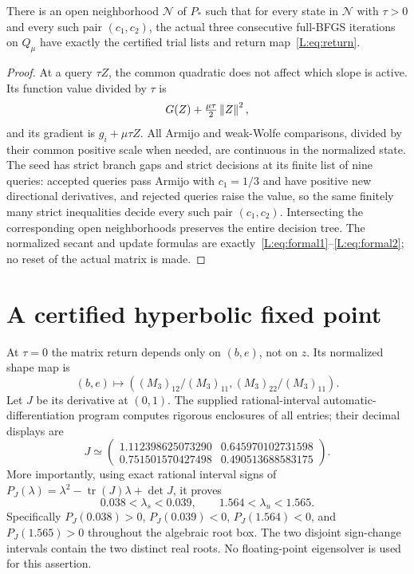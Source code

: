 \begin{lemma}\label{L:lem:agreement}
There is an open neighborhood $\mathcal N$ of $P_*$ such that for every state in $\mathcal N$ with $\tau>0$ and every such pair $(c_1,c_2)$, the actual three consecutive full-BFGS iterations on $Q_\mu$ have exactly the certified trial lists and return map~\eqref{L:eq:return}.
\end{lemma}
\begin{proof}
At a query $\tau Z$, the common quadratic does not affect which slope is active. Its function value divided by $\tau$ is
\[
 G(Z)+\tfrac{\mu\tau}{2}\left\lVert Z\right\rVert^2,
\]
and its gradient is $g_i+\mu\tau Z$. All Armijo and weak-Wolfe comparisons, divided by their common positive scale when needed, are continuous in the normalized state. The seed has strict branch gaps and strict decisions at its finite list of nine queries: accepted queries pass Armijo with $c_1=1/3$ and have positive new directional derivatives, and rejected queries raise the value, so the same finitely many strict inequalities decide every such pair $(c_1,c_2)$. Intersecting the corresponding open neighborhoods preserves the entire decision tree. The normalized secant and update formulas are exactly~\eqref{L:eq:formal1}--\eqref{L:eq:formal2}; no reset of the actual matrix is made.
\end{proof}


\setcounter{section}{3}
\setcounter{theorem}{2}
\setcounter{lemma}{1}
\setcounter{corollary}{0}
\setcounter{proposition}{0}
\setcounter{remark}{0}
\setcounter{equation}{5}


\section{A certified hyperbolic fixed point}

At $\tau=0$ the matrix return depends only on $(b,e)$, not on $z$. Its normalized shape map is
\[
 (b,e)\longmapsto ((M_3)_{12}/(M_3)_{11},(M_3)_{22}/(M_3)_{11}).
\]
Let $J$ be its derivative at $(0,1)$. The supplied rational-interval automatic-differentiation program computes rigorous enclosures of all entries; their decimal displays are
\[
 J\simeq\begin{pmatrix}
 1.112398625073290&0.645970102731598\\
 0.751501570427498&0.490513688583175
 \end{pmatrix}.
\]
More importantly, using exact rational interval signs of
$P_J(\lambda)=\lambda^2-\operatorname{tr}(J)\lambda+\det J$, it proves
\begin{equation}\label{L:eq:eigshape}
 0.038<\lambda_s<0.039,\qquad 1.564<\lambda_u<1.565.
\end{equation}
Specifically $P_J(0.038)>0$, $P_J(0.039)<0$, $P_J(1.564)<0$, and $P_J(1.565)>0$ throughout the algebraic root box. The two disjoint sign-change intervals contain the two distinct real roots. No floating-point eigensolver is used for this assertion.

